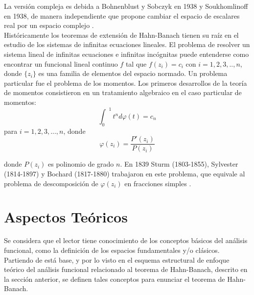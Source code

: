 \documentclass[10pt]{amsart}
\theoremstyle{remark}
\numberwithin{equation}{section}
\begin{document}
La versión compleja es debida a Bohnenblust y Sobczyk en 1938 y Soukhomlinoff en 1938, de manera independiente que propone cambiar el espacio de escalares real por un espacio complejo \cite{ArtAca01}.\\


Históricamente los teoremas de extensión de Hahn-Banach tienen su raíz en el estudio de los sistemas de infinitas ecuaciones lineales. El problema de resolver un sistema lineal de infinitas ecuaciones e infinitas incógnitas puede entenderse como encontrar un funcional lineal continuo $f$ tal que $f(z_i)=c_i$ con $i=1, 2, 3, .., n$, donde $\{z_i\}$ es una familia de elementos del espacio normado. Un problema particular fue el problema de los momentos. Los primeros desarrollos de la teoría de momentos consistieron en un tratamiento algebraico en el caso particular de momentos: 
\[ {\int_0}^1 t^n d\varphi(t) = c_n\]
para  $i=1, 2, 3, ..., n$, donde
\[\varphi(z_i)= \frac{P'(z_i)}{P(z_i)}\]

donde $P(z_i)$ es polinomio de grado $n$. En 1839 Sturm (1803-1855), Sylvester (1814-1897) y Bochard (1817-1880) trabajaron en este problema, que equivale al problema de descomposición de $\varphi(z_i)$ en fracciones simples \cite{Lib20}.\\  



\section{Aspectos Teóricos}
Se considera que el lector tiene conocimiento de los conceptos básicos del análisis funcional, como la definición de los espacios fundamentales y/o clásicos. Partiendo de está base, y por lo visto en el esquema estructural de enfoque teórico del análisis funcional relacionado al teorema de Hahn-Banach, descrito en la sección anterior, se definen tales conceptos para enunciar el teorema de Hahn-Banach.\\
\end{document}
